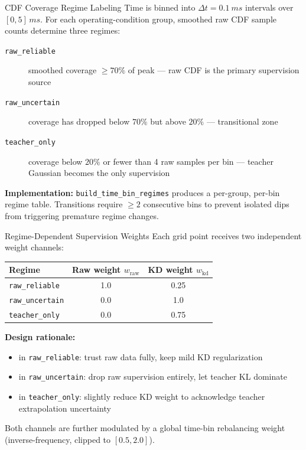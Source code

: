 \documentclass[UTF8,aspectratio=169]{ctexbeamer}
\begin{document}
\begin{frame}{CDF Coverage Regime Labeling}
Time is binned into $\Delta t=\SI{0.1}{ms}$ intervals over $[0, 5]\,\si{ms}$. For each operating-condition group, smoothed raw CDF sample counts determine three regimes:

\vspace{0.3em}
\begin{description}
  \item[\texttt{raw\_reliable}] smoothed coverage $\geq70\%$ of peak --- raw CDF is the primary supervision source
  \item[\texttt{raw\_uncertain}] coverage has dropped below $70\%$ but above $20\%$ --- transitional zone
  \item[\texttt{teacher\_only}] coverage below $20\%$ or fewer than 4 raw samples per bin --- teacher Gaussian becomes the only supervision
\end{description}

\vspace{0.3em}
\textbf{Implementation:} \texttt{build\_time\_bin\_regimes} produces a per-group, per-bin regime table. Transitions require $\geq2$ consecutive bins to prevent isolated dips from triggering premature regime changes.
\end{frame}

\begin{frame}{Regime-Dependent Supervision Weights}
Each grid point receives two independent weight channels:

\vspace{0.3em}
\begin{center}
\begin{tabular}{lcc}
\toprule
Regime & Raw weight $w_{\mathrm{raw}}$ & KD weight $w_{\mathrm{kd}}$ \\
\midrule
\texttt{raw\_reliable}   & 1.0 & 0.25 \\
\texttt{raw\_uncertain}  & 0.0 & 1.0  \\
\texttt{teacher\_only}   & 0.0 & 0.75 \\
\bottomrule
\end{tabular}
\end{center}

\vspace{0.3em}
\textbf{Design rationale:}
\begin{itemize}
  \item in \texttt{raw\_reliable}: trust raw data fully, keep mild KD regularization
  \item in \texttt{raw\_uncertain}: drop raw supervision entirely, let teacher KL dominate
  \item in \texttt{teacher\_only}: slightly reduce KD weight to acknowledge teacher extrapolation uncertainty
\end{itemize}

Both channels are further modulated by a global time-bin rebalancing weight (inverse-frequency, clipped to $[0.5, 2.0]$).
\end{frame}
\end{document}
